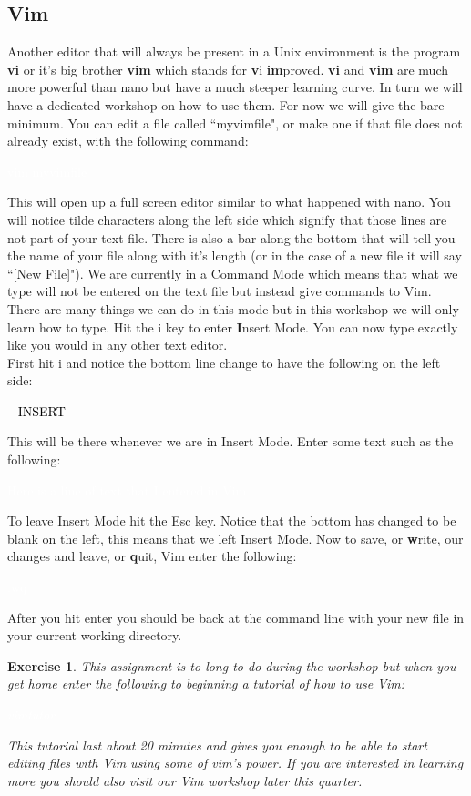 \documentclass{book}
\newcommand{\commandline}[1]{\begin{center} \colorbox{Dark}{\textcolor{white}{#1}} \end{center}}
\newcommand{\exampleout}[1]{\begin{center} \colorbox{Light}{\textcolor{black}{#1}} \end{center}}
\newtheorem{ex}{Exercise}[chapter]
\begin{document}
\subsection{Vim}
Another editor that will always be present in a Unix environment is the program \textbf{vi} or it's big brother \textbf{vim} which stands for \textbf{v}i \textbf{im}proved. \textbf{vi} and \textbf{vim} are much more powerful than nano but have a much steeper learning curve. In turn we will have a dedicated workshop on how to use them. For now we will give the bare minimum. You can edit a file called ``myvimfile", or make one if that file does not already exist, with the following command:
\commandline{vim myvimfile}
This will open up a full screen editor similar to what happened with nano. You will notice tilde characters along the left side which signify that those lines are not part of your text file. There is also a bar along the bottom that will tell you the name of your file along with it's length (or in the case of a new file it will say ``[New File]"). We are currently in a Command Mode which means that what we type will not be entered on the text file but instead give commands to Vim. There are many things we can do in this mode but in this workshop we will only learn how to type. Hit the i key to enter \textbf{I}nsert Mode. You can now type exactly like you would in any other text editor. \\
First hit i and notice the bottom line change to have the following on the left side:
\exampleout{--  INSERT  --}
This will be there whenever we are in Insert Mode. Enter some text such as the following:
\commandline{ Here is a line of text that I entered in Vim}
To leave Insert Mode hit the Esc key. Notice that the bottom has changed to be blank on the left, this means that we left Insert Mode. Now to save, or \textbf{w}rite, our changes and leave, or \textbf{q}uit, Vim enter the following:
\commandline{:wq}
After you hit enter you should be back at the command line with your new file in your current working directory.
\begin{ex}
    This assignment is to long to do during the workshop but when you get home enter the following to beginning a tutorial of how to use Vim:
    \commandline{vimtutor}
    This tutorial last about 20 minutes and gives you enough to be able to start editing files with Vim using some of vim's power. If you are interested in learning more you should also visit our Vim workshop later this quarter.  
\end{ex}
\end{document}
